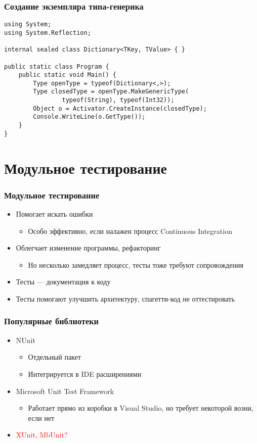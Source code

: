 \documentclass[xetex,mathserif,serif]{beamer}
\begin{document}
	\begin{frame}[fragile]
		\frametitle{Создание экземпляра типа-генерика}
		\begin{footnotesize}
			\begin{verbatim}
using System;
using System.Reflection;

internal sealed class Dictionary<TKey, TValue> { }

public static class Program {
    public static void Main() {
        Type openType = typeof(Dictionary<,>);
        Type closedType = openType.MakeGenericType(
                typeof(String), typeof(Int32));
        Object o = Activator.CreateInstance(closedType);
        Console.WriteLine(o.GetType());
    }
}
			\end{verbatim}
		\end{footnotesize}
	\end{frame}

	\section{Модульное тестирование}

	\begin{frame}
		\frametitle{Модульное тестирование}
		\begin{itemize}
			\item Помогает искать ошибки
			\begin{itemize}
				\item Особо эффективно, если налажен процесс Continuous Integration
			\end{itemize}
			\item Облегчает изменение программы, рефакторинг
			\begin{itemize}
				\item Но несколько замедляет процесс, тесты тоже требуют сопровождения
			\end{itemize}
			\item Тесты --- документация к коду
			\item Тесты помогают улучшить архитектуру, спагетти-код не оттестировать
		\end{itemize}
	\end{frame}

	\begin{frame}
		\frametitle{Популярные библиотеки}
		\begin{itemize}
			\item NUnit
			\begin{itemize}
				\item Отдельный пакет
				\item Интегрируется в IDE расширениями
			\end{itemize}
			\item Microsoft Unit Test Framework
			\begin{itemize}
				\item Работает прямо из коробки в Visual Studio, но требует некоторой возни, если нет
			\end{itemize}
			\item \textcolor{red}{XUnit, MbUnit?}
		\end{itemize}
	\end{frame}
\end{document}
